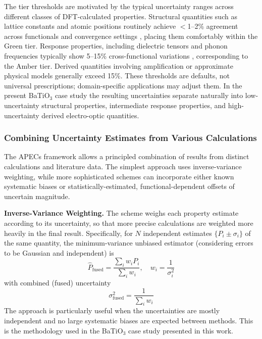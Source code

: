 \documentclass[twocolumn,superscriptaddress,amsmath,amssymb,longbibliography]{revtex4-2}
\begin{document}
The tier thresholds are motivated by the typical uncertainty
ranges across different classes of DFT-calculated properties. Structural
quantities such as lattice constants and atomic positions routinely achieve
$<$1--2\% agreement across functionals and convergence
settings \cite{Lejaeghere2016}, placing them comfortably within the Green tier.
Response properties, including dielectric tensors and phonon frequencies typically
show 5--15\% cross-functional variations \cite{Ghosez1999,Wahl2008}, corresponding to the Amber tier.
Derived
quantities involving amplification or approximate physical models generally
exceed 15\%.
These thresholds are defaults, not universal prescriptions;
domain-specific applications may adjust them. In the present BaTiO$_3$ case study the resulting uncertainties separate naturally into low-uncertainty structural properties, intermediate response properties, and high-uncertainty derived electro-optic quantities.

\subsubsection{Combining Uncertainty Estimates from Various Calculations}
\label{sec:normalization}

The APECs framework allows a principled combination of results from distinct calculations and literature data. The simplest approach uses inverse-variance weighting, while more sophisticated schemes can incorporate either known systematic biases or statistically-estimated, functional-dependent offsets of uncertain magnitude.

{\bf Inverse-Variance Weighting.}
 The scheme weighs each property estimate according to its uncertainty, so that more precise calculations are weighted more heavily in the final result. Specifically, for $N$ independent estimates $\{P_i \pm \sigma_i\}$ of the same quantity, the
minimum-variance unbiased estimator (considering errors to be Gaussian and
independent) is \cite{Sivia2006}
\begin{equation}
    \hat{P}_{\mathrm{fused}} = \frac{\sum_i w_i P_i}{\sum_i w_i}, \quad
    w_i = \frac{1}{\sigma_i^2}
    \label{eq:ivw}
\end{equation}
with combined (fused) uncertainty
\begin{equation}
    \sigma_{\mathrm{fused}}^2 = \frac{1}{\sum_i w_i}
    \label{eq:ivw_uncertainty}
\end{equation}
The approach is particularly useful when the uncertainties are mostly independent and no large systematic biases are expected between methods. This is the methodology used in the BaTiO$_3$
case study presented in this work.
\end{document}
